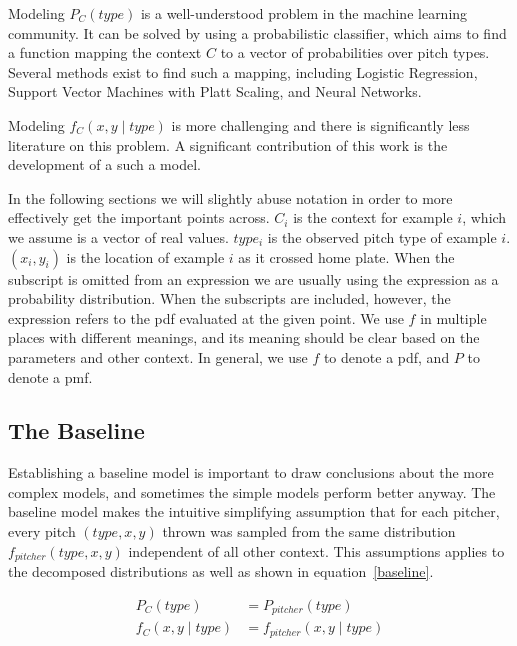 \documentclass{article}
\begin{document}
Modeling $ P_C(type) $ is a well-understood problem in the machine learning community.  It can be solved by using a probabilistic classifier, which aims to find a function mapping the context $C$ to a vector of probabilities over pitch types.  Several methods exist to find such a mapping, including Logistic Regression, Support Vector Machines with Platt Scaling, and Neural Networks. 

Modeling $ f_C(x, y \mid type) $ is more challenging and there is significantly less literature on this problem.  A significant contribution of this work is the development of a such a model.

In the following sections we will slightly abuse notation in order to more effectively get the important points across.  $ C_i $ is the context for example $i$, which we assume is a vector of real values.  $ type_i $ is the observed pitch type of example $i$.  $ (x_i, y_i) $ is the location of example $i$ as it crossed home plate.  When the subscript is omitted from an expression we are usually using the expression as a probability distribution.  When the subscripts are included, however, the expression refers to the pdf evaluated at the given point.  We use $ f $ in multiple places with different meanings, and its meaning should be clear based on the parameters and other context.  In general, we use $f$ to denote a pdf, and $P$ to denote a pmf.  

\subsection{The Baseline}

Establishing a baseline model is important to draw conclusions about the more complex models, and sometimes the simple models perform better anyway.  The baseline model makes the intuitive simplifying assumption that for each pitcher, every pitch $ (type, x, y) $ thrown was sampled from the same distribution $ f_{pitcher}(type, x, y) $ independent of all other context.  This assumptions applies to the decomposed distributions as well as shown in equation~\ref{baseline}.

\begin{equation} \label{baseline}
\begin{split}
P_C(type) &= P_{pitcher}(type) \\
f_C(x, y \mid type) &= f_{pitcher}(x, y \mid type)\\
\end{split}
\end{equation}
\end{document}
